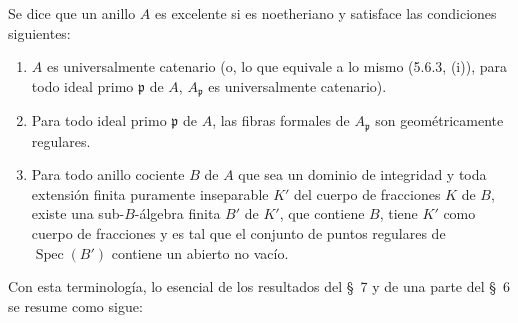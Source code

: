 \begin{definition}[7.8.2]
Se dice que un anillo $A$ es \textup{excelente} si es noetheriano y satisface las
condiciones siguientes:
\begin{enumerate}
\item[\emph{(i)}] $A$ es universalmente catenario \textup{(o, lo que equivale a lo mismo
(5.6.3, (i)),} para todo ideal primo $\mathfrak p$ de $A$,
$A_{\mathfrak p}$ es universalmente catenario).
\item[\emph{(ii)}] Para todo ideal primo $\mathfrak p$ de $A$, las fibras
formales de $A_{\mathfrak p}$ son geométricamente regulares.
\item[\emph{(iii)}] Para todo anillo cociente $B$ de $A$ que sea un dominio de
integridad y toda extensión finita puramente inseparable $K'$ del cuerpo de
fracciones $K$ de $B$, existe una sub-$B$-álgebra finita $B'$ de $K'$,
que contiene $B$, tiene $K'$ como cuerpo de fracciones y es tal que el conjunto
de puntos regulares de $\operatorname{Spec}(B')$ contiene un abierto no vacío.
\end{enumerate}

\upshape
Con esta terminología, lo esencial de los resultados del \S~7 y de una parte
del \S~6 se resume como sigue:
\end{definition}
